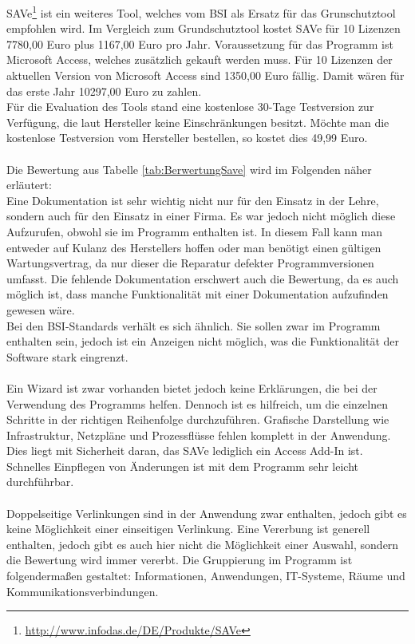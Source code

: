 SAVe\footnote{\url{http://www.infodas.de/DE/Produkte/SAVe}} ist ein weiteres Tool, welches vom BSI als Ersatz für das Grunschutztool empfohlen wird. Im Vergleich zum Grundschutztool kostet SAVe für 10 Lizenzen 7780,00 Euro plus 1167,00 Euro pro Jahr. Voraussetzung für das Programm ist Microsoft Access, welches zusätzlich gekauft werden muss. Für 10 Lizenzen der aktuellen Version von Microsoft Access sind 1350,00 Euro fällig. Damit wären für das erste Jahr 10297,00 Euro zu zahlen.\\
Für die Evaluation des Tools stand eine kostenlose 30-Tage Testversion zur Verfügung, die laut Hersteller keine Einschränkungen besitzt. Möchte man die kostenlose Testversion vom Hersteller bestellen, so kostet dies 49,99 Euro.\\
\\
Die Bewertung aus Tabelle \ref{tab:BerwertungSave} wird im Folgenden näher erläutert:\\
Eine Dokumentation ist sehr wichtig nicht nur für den Einsatz in der Lehre, sondern auch für den Einsatz in einer Firma. Es war jedoch nicht möglich diese Aufzurufen, obwohl sie im Programm enthalten ist. In diesem Fall kann man entweder auf Kulanz des Herstellers hoffen oder man benötigt einen gültigen Wartungsvertrag, da nur dieser die Reparatur defekter Programmversionen umfasst. Die fehlende Dokumentation erschwert auch die Bewertung, da es auch möglich ist, dass manche Funktionalität mit einer Dokumentation aufzufinden gewesen wäre.\\
Bei den BSI-Standards verhält es sich ähnlich. Sie sollen zwar im Programm enthalten sein, jedoch ist ein Anzeigen nicht möglich, was die Funktionalität der Software stark eingrenzt.\\
\\
Ein Wizard ist zwar vorhanden bietet jedoch keine Erklärungen, die bei der Verwendung des Programms helfen. Dennoch ist es hilfreich, um die einzelnen Schritte in der richtigen Reihenfolge durchzuführen. Grafische Darstellung wie Infrastruktur, Netzpläne und Prozessflüsse fehlen komplett in der Anwendung. Dies liegt mit Sicherheit daran, das SAVe lediglich ein Access Add-In ist. Schnelles Einpflegen von Änderungen ist mit dem Programm sehr leicht durchführbar.\\
\\
Doppelseitige Verlinkungen sind in der Anwendung zwar enthalten, jedoch gibt es keine Möglichkeit einer einseitigen Verlinkung. Eine Vererbung ist generell enthalten, jedoch gibt es auch hier nicht die Möglichkeit einer Auswahl, sondern die Bewertung wird immer vererbt. Die Gruppierung im Programm ist folgendermaßen gestaltet: Informationen, Anwendungen, IT-Systeme, Räume und Kommunikationsverbindungen.\\
